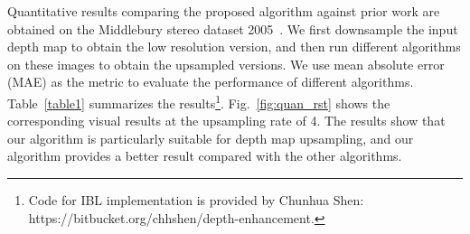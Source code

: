 Quantitative results comparing the proposed algorithm against prior work are obtained on the Middlebury stereo dataset 2005~\cite{scharstein2003high}. We first downsample the input depth map to obtain the low resolution version, and then run different algorithms on these images to obtain the upsampled versions. We use mean absolute error (MAE) as the metric to evaluate the performance of different algorithms. Table~\ref{table1} summarizes the results\footnote{Code for IBL implementation is provided by Chunhua Shen: https://bitbucket.org/chhshen/depth-enhancement.}. Fig.~\ref{fig:quan_rst} shows the corresponding visual results at the upsampling rate of 4. The results show that our algorithm is particularly suitable for depth map upsampling, and our algorithm provides a better result compared with the other algorithms. 


